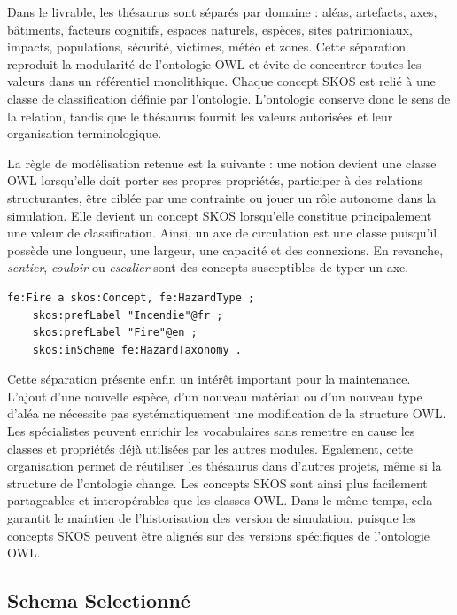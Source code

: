 \documentclass{article}
\begin{document}
Dans le livrable, les thésaurus sont séparés par domaine : aléas, artefacts, axes, bâtiments, facteurs cognitifs, espaces naturels, espèces, sites patrimoniaux, impacts, populations, sécurité, victimes, météo et zones. Cette séparation reproduit la modularité de l'ontologie OWL et évite de concentrer toutes les valeurs dans un référentiel monolithique. Chaque concept SKOS est relié à une classe de classification définie par l'ontologie. L'ontologie conserve donc le sens de la relation, tandis que le thésaurus fournit les valeurs autorisées et leur organisation terminologique.

La règle de modélisation retenue est la suivante : une notion devient une classe OWL lorsqu'elle doit porter ses propres propriétés, participer à des relations structurantes, être ciblée par une contrainte ou jouer un rôle autonome dans la simulation. Elle devient un concept SKOS lorsqu'elle constitue principalement une valeur de classification. Ainsi, un axe de circulation est une classe puisqu'il possède une longueur, une largeur, une capacité et des connexions. En revanche, \textit{sentier}, \textit{couloir} ou \textit{escalier} sont des concepts susceptibles de typer un axe.

\begin{lstlisting}[language=Turtle,caption={Exemple de concept contrôlé dans un thésaurus SKOS}]
fe:Fire a skos:Concept, fe:HazardType ;
    skos:prefLabel "Incendie"@fr ;
    skos:prefLabel "Fire"@en ;
    skos:inScheme fe:HazardTaxonomy .
\end{lstlisting}

Cette séparation présente enfin un intérêt important pour la maintenance. L'ajout d'une nouvelle espèce, d'un nouveau matériau ou d'un nouveau type d'aléa ne nécessite pas systématiquement une modification de la structure OWL. Les spécialistes peuvent enrichir les vocabulaires sans remettre en cause les classes et propriétés déjà utilisées par les autres modules. Egalement, cette organisation permet de réutiliser les thésaurus dans d'autres projets, même si la structure de l'ontologie change. Les concepts SKOS sont ainsi plus facilement partageables et interopérables que les classes OWL. Dans le même temps, cela garantit le maintien de l'historisation des version de simulation, puisque les concepts SKOS peuvent être alignés sur des versions spécifiques de l'ontologie OWL.

\subsection{Schema Selectionné}
\end{document}
